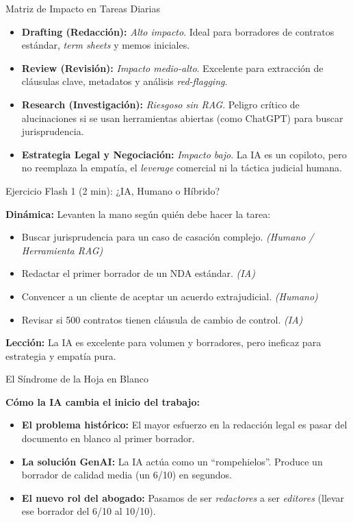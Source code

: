 \documentclass[aspectratio=169]{beamer}
\begin{document}
\begin{frame}{Matriz de Impacto en Tareas Diarias}


\begin{itemize}
  \item \textbf{Drafting (Redacción):} \textit{Alto impacto}. Ideal para borradores de contratos estándar, \textit{term sheets} y memos iniciales.
  \item \textbf{Review (Revisión):} \textit{Impacto medio-alto}. Excelente para extracción de cláusulas clave, metadatos y análisis \textit{red-flagging}.
  \item \textbf{Research (Investigación):} \textit{Riesgoso sin RAG}. Peligro crítico de alucinaciones si se usan herramientas abiertas (como ChatGPT) para buscar jurisprudencia.
  \item \textbf{Estrategia Legal y Negociación:} \textit{Impacto bajo}. La IA es un copiloto, pero no reemplaza la empatía, el \textit{leverage} comercial ni la táctica judicial humana.
\end{itemize}
\end{frame}

\begin{frame}{Ejercicio Flash 1 (2 min): ¿IA, Humano o Híbrido?}


\textbf{Dinámica:} Levanten la mano según quién debe hacer la tarea:
\begin{itemize}
  \item Buscar jurisprudencia para un caso de casación complejo. \textit{(Humano / Herramienta RAG)}
  \item Redactar el primer borrador de un NDA estándar. \textit{(IA)}
  \item Convencer a un cliente de aceptar un acuerdo extrajudicial. \textit{(Humano)}
  \item Revisar si 500 contratos tienen cláusula de cambio de control. \textit{(IA)}
\end{itemize}
\textbf{Lección:} La IA es excelente para volumen y borradores, pero ineficaz para estrategia y empatía pura.

\end{frame}

\begin{frame}{El Síndrome de la Hoja en Blanco}


\textbf{Cómo la IA cambia el inicio del trabajo:}
\begin{itemize}
  \item \textbf{El problema histórico:} El mayor esfuerzo en la redacción legal es pasar del documento en blanco al primer borrador.
  \item \textbf{La solución GenAI:} La IA actúa como un ``rompehielos''. Produce un borrador de calidad media (un 6/10) en segundos.
  \item \textbf{El nuevo rol del abogado:} Pasamos de ser \textit{redactores} a ser \textit{editores} (llevar ese borrador del 6/10 al 10/10).
\end{itemize}
\end{frame}
\end{document}
